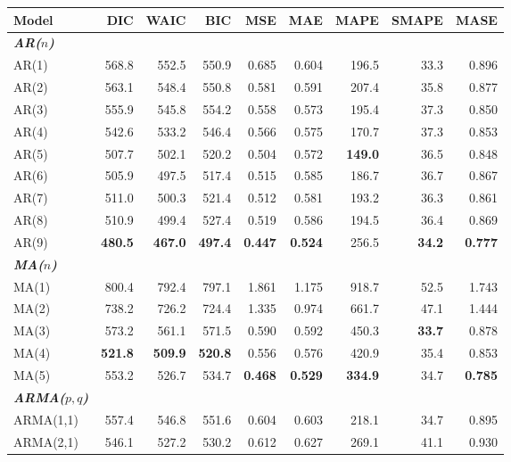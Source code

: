 \documentclass{Configuration_Files/PoliMi3i_thesis}
\begin{document}
\begin{table}[H]
  \centering
  \small
  \begin{tabular}{@{}lrrrrrrrr@{}}
    \toprule
    \textbf{Model} & \textbf{DIC} & \textbf{WAIC} & \textbf{BIC} & \textbf{MSE} 
      & \textbf{MAE} & \textbf{MAPE} & \textbf{SMAPE} & \textbf{MASE} \\
    \midrule
\textbf{\textit{AR(\(n\))}} \\
    AR(1)  & 568.8 & 552.5 & 550.9 & 0.685 & 0.604 & 196.5 & 33.3 & 0.896 \\
    AR(2)  & 563.1 & 548.4 & 550.8 & 0.581 & 0.591 & 207.4 & 35.8 & 0.877 \\
    AR(3)  & 555.9 & 545.8 & 554.2 & 0.558 & 0.573 & 195.4 & 37.3 & 0.850 \\
    AR(4)  & 542.6 & 533.2 & 546.4 & 0.566 & 0.575 & 170.7 & 37.3 & 0.853 \\
    AR(5)  & 507.7 & 502.1 & 520.2 & 0.504 & 0.572 & \textbf{149.0} & 36.5 & 0.848 \\
    AR(6)  & 505.9 & 497.5 & 517.4 & 0.515 & 0.585 & 186.7 & 36.7 & 0.867 \\
    AR(7)  & 511.0 & 500.3 & 521.4 & 0.512 & 0.581 & 193.2 & 36.3 & 0.861 \\
    AR(8)  & 510.9 & 499.4 & 527.4 & 0.519 & 0.586 & 194.5 & 36.4 & 0.869 \\
    AR(9)  & \textbf{480.5} & \textbf{467.0} & \textbf{497.4} 
           & \textbf{0.447} & \textbf{0.524} & 256.5 & \textbf{34.2} & \textbf{0.777} \\
    \midrule
\textbf{\textit{MA(\(n\))}} \\
    MA(1)  & 800.4 & 792.4 & 797.1 & 1.861 & 1.175 & 918.7 & 52.5 & 1.743 \\
    MA(2)  & 738.2 & 726.2 & 724.4 & 1.335 & 0.974 & 661.7 & 47.1 & 1.444 \\
    MA(3)  & 573.2 & 561.1 & 571.5 & 0.590 & 0.592 & 450.3 & \textbf{33.7} & 0.878 \\
    MA(4)  & \textbf{521.8} & \textbf{509.9} & \textbf{520.8} & 0.556 & 0.576 & 420.9 & 35.4 & 0.853 \\
    MA(5)  & 553.2 & 526.7 & 534.7
           & \textbf{0.468} & \textbf{0.529} & \textbf{334.9} & 34.7 & \textbf{0.785} \\
    \midrule
\textbf{\textit{ARMA(\(p,q\))}} \\
    ARMA(1,1) & 557.4 & 546.8 & 551.6 & 0.604 & 0.603 & 218.1 & 34.7 & 0.895 \\
    ARMA(2,1) & 546.1 & 527.2 & 530.2 & 0.612 & 0.627 & 269.1 & 41.1 & 0.930 \\

\end{tabular}
\end{table}
\end{document}
